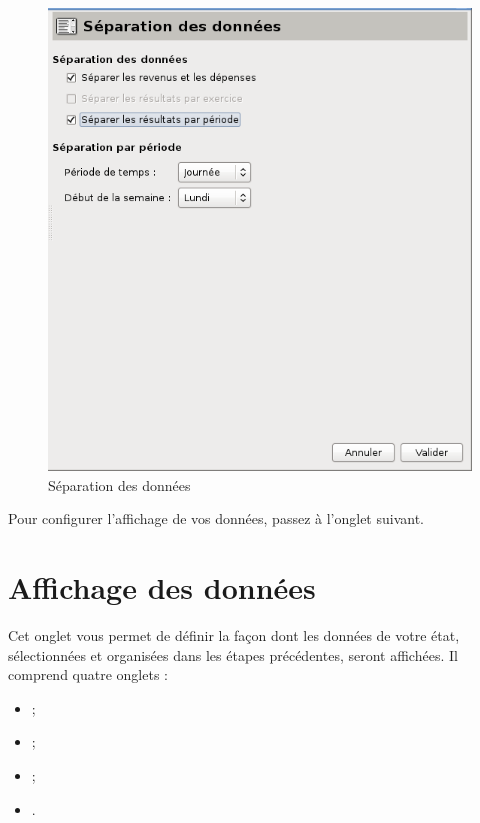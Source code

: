 \ifIllustration
\begin{figure}[htbp]
\begin{center}
\includegraphics[scale=0.5]{image/screenshot/reportcreation_organisation_separation}
\end{center}
\caption{Séparation des données}
\label{reportcreation-organisation-separation-img}
\end{figure}
\fi

Pour configurer l'affichage de vos données, passez à l'onglet suivant.


\section{Affichage des données\label{reportscreation-display}}


Cet onglet vous permet de définir la façon dont les données de votre état, sélectionnées et
organisées dans les étapes précédentes, seront affichées. Il comprend quatre onglets :

\begin{itemize}
	\item {} ;
	\item {} ;
	\item {} ;
	\item {}.
\end{itemize} 


